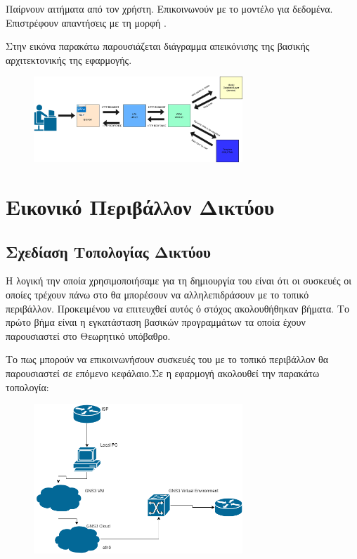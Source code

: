Παίρνουν αιτήματα από τον χρήστη.
Επικοινωνούν με το μοντέλο για δεδομένα.
Επιστρέφουν απαντήσεις με τη μορφή .

Στην εικόνα παρακάτω παρουσιάζεται διάγραμμα απεικόνισης της βασικής αρχιτεκτονικής της εφαρμογής.

\begin{figure}[h]
	\centering
	\includegraphics[width=0.7\textwidth]{graphics/MTV.drawio.png}
	\caption{}
\end{figure}



\section{Εικονικό Περιβάλλον Δικτύου }



\subsection{Σχεδίαση Τοπολογίας Δικτύου}

Η λογική την οποία χρησιμοποιήσαμε για τη δημιουργία του  
είναι ότι οι συσκευές οι οποίες τρέχουν πάνω στο  θα μπορέσουν
να αλληλεπιδράσουν με το τοπικό  περιβάλλον. Προκειμένου να επιτευχθεί αυτός ό στόχος
ακολουθήθηκαν βήματα. Το πρώτο βήμα είναι η εγκατάσταση βασικών προγραμμάτων τα οποία έχουν παρουσιαστεί στο Θεωρητικό υπόβαθρο.

Το πως μπορούν να επικοινωνήσουν συσκευές του  με το τοπικό περιβάλλον θα παρουσιαστεί σε επόμενο κεφάλαιο.Σε  η εφαρμογή ακολουθεί την παρακάτω τοπολογία:

\FloatBarrier

\begin{figure}[htb]
	\centering
	\includegraphics[width=0.7\textwidth]{graphics/diagram.drawio.png}
	\caption{ }
\end{figure}


